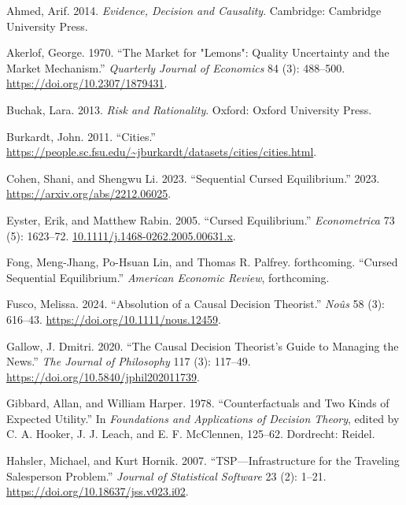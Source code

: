 \documentclass[
  12pt,
  letterpaper,
  DIV=11,
  numbers=noendperiod,
  twoside]{scrartcl}
\newlength{\cslhangindent}
\newenvironment{CSLReferences}[2] %
 {\begin{list}{}{%
  \setlength{\itemindent}{0pt}
  \setlength{\leftmargin}{0pt}
  \setlength{\parsep}{0pt}
  \ifodd #1
   \setlength{\leftmargin}{\cslhangindent}
   \setlength{\itemindent}{-1\cslhangindent}
  \fi
  \setlength{\itemsep}{#2\baselineskip}}}
 {\end{list}}
\begin{document}
\label{refs}
\begin{CSLReferences}{1}{0}
Ahmed, Arif. 2014. \emph{Evidence, Decision and Causality}. Cambridge:
{C}ambridge {U}niversity {P}ress.

Akerlof, George. 1970. {``The Market for "Lemons": Quality Uncertainty
and the Market Mechanism.''} \emph{Quarterly Journal of Economics} 84
(3): 488--500. \url{https://doi.org/10.2307/1879431}.

Buchak, Lara. 2013. \emph{Risk and Rationality}. Oxford: Oxford
University Press.

Burkardt, John. 2011. {``Cities.''}
\url{https://people.sc.fsu.edu/~jburkardt/datasets/cities/cities.html}.

Cohen, Shani, and Shengwu Li. 2023. {``Sequential Cursed Equilibrium.''}
2023. \url{https://arxiv.org/abs/2212.06025}.

Eyster, Erik, and Matthew Rabin. 2005. {``Cursed Equilibrium.''}
\emph{Econometrica} 73 (5): 1623--72.
\href{https://10.1111/j.1468-0262.2005.00631.x}{10.1111/j.1468-0262.2005.00631.x}.

Fong, Meng-Jhang, Po-Hsuan Lin, and Thomas R. Palfrey. forthcoming.
{``Cursed Sequential Equilibrium.''} \emph{American Economic Review},
forthcoming.

Fusco, Melissa. 2024. {``Absolution of a Causal Decision Theorist.''}
\emph{No{û}s} 58 (3): 616--43. \url{https://doi.org/10.1111/nous.12459}.

Gallow, J. Dmitri. 2020. {``The Causal Decision Theorist's Guide to
Managing the News.''} \emph{The Journal of Philosophy} 117 (3): 117--49.
\url{https://doi.org/10.5840/jphil202011739}.

Gibbard, Allan, and William Harper. 1978. {``Counterfactuals and Two
Kinds of Expected Utility.''} In \emph{Foundations and Applications of
Decision Theory}, edited by C. A. Hooker, J. J. Leach, and E. F.
McClennen, 125--62. Dordrecht: Reidel.

Hahsler, Michael, and Kurt Hornik. 2007. {``TSP---Infrastructure for the
Traveling Salesperson Problem.''} \emph{Journal of Statistical Software}
23 (2): 1--21. \url{https://doi.org/10.18637/jss.v023.i02}.


\end{CSLReferences}
\end{document}
